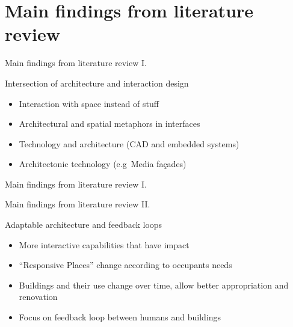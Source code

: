 \documentclass[10pt]{beamer}
\begin{document}
\section{Main findings from literature review}


\begin{frame}{Main findings from literature review I.}
	\begin{block}{Intersection of architecture and interaction design}
	\begin{itemize}
        \pause{}
		\item Interaction with space instead of stuff
        \pause{}
		\item Architectural and spatial metaphors in interfaces
        \pause{}
        \item Technology and architecture (CAD and embedded systems)
        \pause{}
        \item Architectonic technology (e.g\ Media fa\c{c}ades)
	\end{itemize}	
	\end{block}
\end{frame}

\begin{frame}{Main findings from literature review I.}
    \begin{figure}
    \centering
    \end{figure}
\end{frame}


\begin{frame}{Main findings from literature review II.}
	\begin{block}{Adaptable architecture and feedback loops}
	\begin{itemize}
        \pause{}
		\item More interactive capabilities that have impact
        \pause{}
		\item ``Responsive Places'' change according to occupants needs
        \pause{}
        \item Buildings and their use change over time, allow better appropriation and renovation
        \pause{}
		\item Focus on feedback loop between humans and buildings
	\end{itemize}	
	\end{block}

\end{frame}
\end{document}
